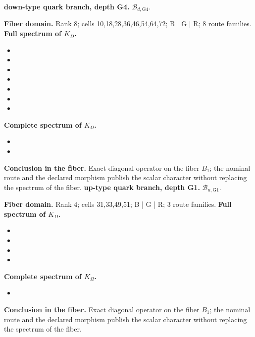 \medskip
{}
\noindent\textbf{down-type quark branch, depth G4.} \(\mathcal B_{d,\mathrm{G4}}\).\par
\noindent\textbf{Fiber domain.} Rank 8; cells 10,18,28,36,46,54,64,72; B | G | R; 8 route families.
\noindent\textbf{Full spectrum of \(K_D\).}
\begin{itemize}
\item \texttt{}
\item \texttt{}
\item \texttt{}
\item \texttt{}
\item \texttt{}
\item \texttt{}
\item \texttt{}
\end{itemize}
\noindent\textbf{Complete spectrum of \(K_\Omega\).}
\begin{itemize}
\item \texttt{}
\item \texttt{}
\end{itemize}
\noindent\textbf{Conclusion in the fiber.} Exact diagonal operator on the fiber \(B_1\); the nominal route and the declared morphism publish the scalar character without replacing the spectrum of the fiber.
\medskip
{}
\noindent\textbf{up-type quark branch, depth G1.} \(\mathcal B_{u,\mathrm{G1}}\).\par
\noindent\textbf{Fiber domain.} Rank 4; cells 31,33,49,51; B | G | R; 3 route families.
\noindent\textbf{Full spectrum of \(K_D\).}
\begin{itemize}
\item \texttt{}
\item \texttt{}
\item \texttt{}
\item \texttt{}
\end{itemize}
\noindent\textbf{Complete spectrum of \(K_\Omega\).}
\begin{itemize}
\item \texttt{}
\end{itemize}
\noindent\textbf{Conclusion in the fiber.} Exact diagonal operator on the fiber \(B_1\); the nominal route and the declared morphism publish the scalar character without replacing the spectrum of the fiber.
